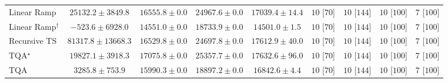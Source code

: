 \begin{tabular}{l|cccc|cccc|}
Linear Ramp & {\cellcolor[HTML]{C3E698}} \color[HTML]{000000} $25132.2\pm 3849.8$ & {\cellcolor[HTML]{E3F4AA}} \color[HTML]{000000} $16555.8\pm 0.0$ & {\cellcolor[HTML]{C4E799}} \color[HTML]{000000} $24967.6\pm 0.0$ & {\cellcolor[HTML]{E2F4AA}} \color[HTML]{000000} $17039.4\pm 14.4$ & {\cellcolor[HTML]{49006A}} \color[HTML]{F1F1F1} $10$ [$70$] & {\cellcolor[HTML]{49006A}} \color[HTML]{F1F1F1} $10$ [$144$] & {\cellcolor[HTML]{49006A}} \color[HTML]{F1F1F1} $10$ [$100$] & {\cellcolor[HTML]{FFF7F3}} \color[HTML]{000000} $7$ [$100$] \\
Linear Ramp$^\dagger$ & {\cellcolor[HTML]{FFFFE5}} \color[HTML]{000000} $-523.6\pm 6928.0$ & {\cellcolor[HTML]{E9F6AF}} \color[HTML]{000000} $14551.0\pm 0.0$ & {\cellcolor[HTML]{DDF1A6}} \color[HTML]{000000} $18733.9\pm 0.0$ & {\cellcolor[HTML]{EAF7AF}} \color[HTML]{000000} $14501.0\pm 1.5$ & {\cellcolor[HTML]{49006A}} \color[HTML]{F1F1F1} $10$ [$70$] & {\cellcolor[HTML]{49006A}} \color[HTML]{F1F1F1} $10$ [$144$] & {\cellcolor[HTML]{49006A}} \color[HTML]{F1F1F1} $10$ [$100$] & {\cellcolor[HTML]{FFF7F3}} \color[HTML]{000000} $7$ [$100$] \\
Recursive TS & {\cellcolor[HTML]{004529}} \color[HTML]{F1F1F1} $81317.8\pm 13668.3$ & {\cellcolor[HTML]{E3F4AA}} \color[HTML]{000000} $16529.8\pm 0.0$ & {\cellcolor[HTML]{C5E89A}} \color[HTML]{000000} $24697.8\pm 0.0$ & {\cellcolor[HTML]{E0F3A8}} \color[HTML]{000000} $17612.9\pm 40.0$ & {\cellcolor[HTML]{49006A}} \color[HTML]{F1F1F1} $10$ [$70$] & {\cellcolor[HTML]{49006A}} \color[HTML]{F1F1F1} $10$ [$144$] & {\cellcolor[HTML]{49006A}} \color[HTML]{F1F1F1} $10$ [$100$] & {\cellcolor[HTML]{FFF7F3}} \color[HTML]{000000} $7$ [$100$] \\
TQA$^\star$ & {\cellcolor[HTML]{DAF0A4}} \color[HTML]{000000} $19827.1\pm 3918.3$ & {\cellcolor[HTML]{E1F3A9}} \color[HTML]{000000} $17075.8\pm 0.0$ & {\cellcolor[HTML]{C3E698}} \color[HTML]{000000} $25357.7\pm 0.0$ & {\cellcolor[HTML]{E0F3A8}} \color[HTML]{000000} $17632.6\pm 96.0$ & {\cellcolor[HTML]{49006A}} \color[HTML]{F1F1F1} $10$ [$70$] & {\cellcolor[HTML]{49006A}} \color[HTML]{F1F1F1} $10$ [$144$] & {\cellcolor[HTML]{49006A}} \color[HTML]{F1F1F1} $10$ [$100$] & {\cellcolor[HTML]{FFF7F3}} \color[HTML]{000000} $7$ [$100$] \\
TQA & {\cellcolor[HTML]{FCFED6}} \color[HTML]{000000} $3285.8\pm 753.9$ & {\cellcolor[HTML]{E5F5AC}} \color[HTML]{000000} $15990.3\pm 0.0$ & {\cellcolor[HTML]{DDF1A6}} \color[HTML]{000000} $18897.2\pm 0.0$ & {\cellcolor[HTML]{E2F4AA}} \color[HTML]{000000} $16842.6\pm 4.4$ & {\cellcolor[HTML]{49006A}} \color[HTML]{F1F1F1} $10$ [$70$] & {\cellcolor[HTML]{49006A}} \color[HTML]{F1F1F1} $10$ [$144$] & {\cellcolor[HTML]{49006A}} \color[HTML]{F1F1F1} $10$ [$100$] & {\cellcolor[HTML]{FFF7F3}} \color[HTML]{000000} $7$ [$100$] \\

\end{tabular}
